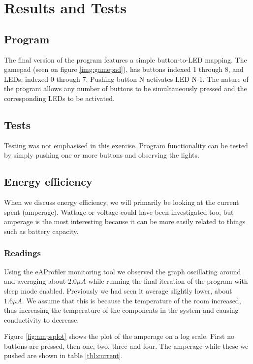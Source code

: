 \chapter{Results and Tests}
\label{chap:results}
\section{Program}
The final version of the program features a simple button-to-LED mapping. The gamepad (seen on figure \ref{img:gamepad}), has buttons indexed 1 through 8, and LEDs, indexed 0 through 7. Pushing button N activates LED N-1. The nature of the program allows any number of buttons to be simultaneously pressed and the corresponding LEDs to be activated.

\section{Tests}
Testing was not emphasised in this exercise. Program functionality can be tested by simply pushing one or more buttons and observing the lights.

\section{Energy efficiency}
When we discuss energy efficiency, we will primarily be looking at the current spent (amperage). Wattage or voltage could have been investigated too, but amperage is the most interesting because it can be more easily related to things such as battery capacity.

\subsection{Readings}
Using the eAProfiler monitoring tool we observed the graph oscillating around and averaging about $2.0 \mu A$ while running the final iteration of the program with sleep mode enabled. Previously we had seen it average slightly lower, about $1.6 \mu A$. We assume that this is because the temperature of the room increased, thus increasing the temperature of the components in the system and causing conductivity to decrease.

Figure \ref{fig:ampsplot} shows the plot of the amperage on a log scale. First no buttons are pressed, then one, two, three and four. The amperage while these we pushed are shown in table \ref{tbl:current}.

